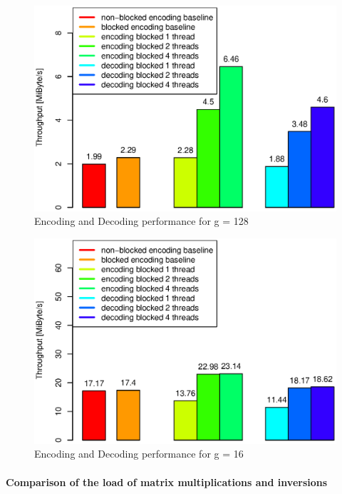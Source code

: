 \begin{figure}[ht!]
\centering
\includegraphics[width=\columnwidth]{images/2015-04-18_encoding_decoding_128.eps}
\caption{Encoding and Decoding performance for g = 128}
\label{enc_dec128}
\end{figure}

\begin{figure}[ht!]
\centering
\includegraphics[width=\columnwidth]{images/2015-04-18_encoding_decoding_16.eps}
\caption{Encoding and Decoding performance for g = 16}
\label{enc_dec16}
\end{figure}



\paragraph{Comparison of the load of matrix multiplications and inversions}

